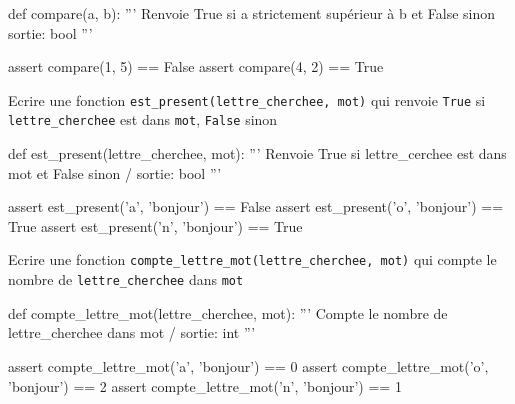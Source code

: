 \documentclass[a4paper,10pt]{report}
\def\ptsexoD{2}
\def\ptsexoE{2}
\def\ptsexoF{2}
\begin{document}
\begin{CodePythontexAlt}[TaillePolice=\large,Largeur=1\linewidth,Centre,PremLigne=1]{}
def compare(a, b):
    ''' Renvoie True si a strictement supérieur à b et False sinon
    sortie: bool '''







assert compare(1, 5) == False
assert compare(4, 2) == True
    \end{CodePythontexAlt}

 \pagebreak
    \pagestyle{DS_LP}

\exods{\ptsexoD}

Ecrire une fonction \verb|est_present(lettre_cherchee, mot)| qui renvoie \verb|True| si \verb|lettre_cherchee| est dans \verb|mot|, \verb|False| sinon

\begin{CodePythontexAlt}[TaillePolice=\large,Largeur=1\linewidth,Centre,PremLigne=1]{}
def est_present(lettre_cherchee, mot):
    ''' Renvoie True si lettre_cerchee est dans mot et False sinon / sortie: bool '''





assert est_present('a', 'bonjour') == False
assert est_present('o', 'bonjour') == True
assert est_present('n', 'bonjour') == True

    \end{CodePythontexAlt}

    \medskip

    \exods{\ptsexoE}


Ecrire une fonction \verb|compte_lettre_mot(lettre_cherchee, mot)| qui compte le nombre de \verb|lettre_cherchee| dans \verb|mot|

\begin{CodePythontexAlt}[TaillePolice=\large,Largeur=1\linewidth,Centre,PremLigne=1]{}
def compte_lettre_mot(lettre_cherchee, mot):
    ''' Compte le nombre de lettre_cherchee dans mot / sortie: int '''








assert compte_lettre_mot('a', 'bonjour') == 0
assert compte_lettre_mot('o', 'bonjour') == 2
assert compte_lettre_mot('n', 'bonjour') == 1
    \end{CodePythontexAlt}

    \medskip

    \exods{\ptsexoF}
\end{document}
